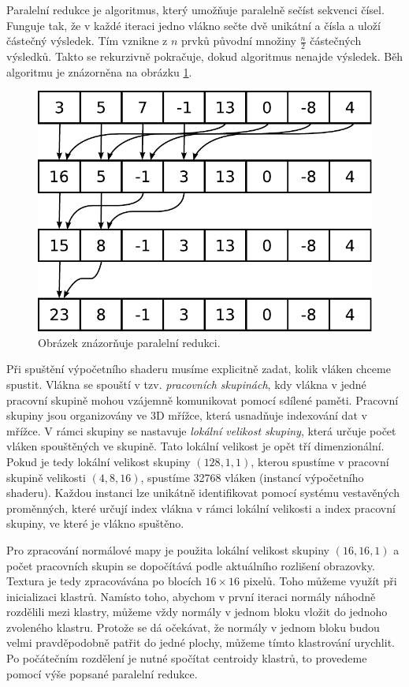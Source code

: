 \documentclass[11pt,twoside,a4paper]{book}
\begin{document}
Paralelní redukce je algoritmus, který umožňuje paralelně sečíst sekvenci čísel. Funguje tak, že v každé iteraci jedno vlákno sečte dvě unikátní a čísla a uloží částečný výsledek. Tím vznikne z $n$ prvků původní množiny $\frac{n}{2}$ částečných výsledků. Takto se rekurzivně pokračuje, dokud algoritmus nenajde výsledek. Běh algoritmu je znázorněna na obrázku \ref{fig:reduction}.

\begin{figure}[h]
\begin{center}
\includegraphics[width=\textwidth*2/3]{figures/reduction}
\caption{Obrázek znázorňuje paralelní redukci.}
\label{fig:reduction}
\end{center}
\end{figure}

Při spuštění výpočetního shaderu musíme explicitně zadat, kolik vláken chceme spustit. Vlákna se spouští v tzv. \emph{pracovních skupinách}, kdy vlákna v jedné pracovní skupině mohou vzájemně komunikovat pomocí sdílené paměti.  Pracovní skupiny jsou organizovány ve 3D mřížce, která usnadňuje indexování dat v mřížce. V rámci skupiny se nastavuje \emph{lokální velikost skupiny}, která určuje počet vláken spouštěných ve skupině. Tato lokální velikost je opět tří dimenzionální.  Pokud je tedy lokální velikost skupiny $(128, 1, 1)$, kterou spustíme v pracovní skupině velikosti $(4, 8, 16)$, spustíme 32768 vláken (instancí výpočetního shaderu). Každou instanci lze unikátně identifikovat pomocí systému vestavěných proměnných, které určují index vlákna v rámci lokální velikosti a index pracovní skupiny, ve které je vlákno spuštěno.

Pro zpracování normálové mapy je použita lokální velikost skupiny $(16, 16, 1)$ a počet pracovních skupin se dopočítává podle aktuálního rozlišení obrazovky. Textura je tedy zpracovávána po blocích $16\times16$ pixelů. Toho můžeme využít při inicializaci klastrů. Namísto toho, abychom v první iteraci normály náhodně rozdělili mezi klastry, můžeme vždy normály v jednom bloku vložit do jednoho zvoleného klastru. Protože se dá očekávat, že normály v jednom bloku budou velmi pravděpodobně patřit do jedné plochy, můžeme tímto klastrování urychlit. Po počátečním rozdělení je nutné spočítat centroidy klastrů, to provedeme pomocí výše popsané paralelní redukce. 
\end{document}
